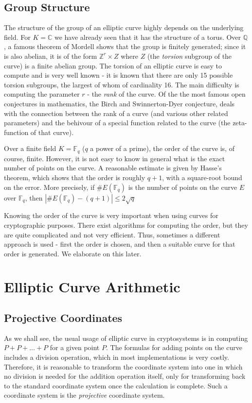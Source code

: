\documentclass[11pt,english]{article}
\begin{document}
\subsection{Group Structure}
The structure of the group of an elliptic curve highly depends on the underlying field. For $K=\mathbb{C}$ we have already seen that it has the structure of a torus.
Over $\mathbb{Q}$, a famous theorem of Mordell shows that the group is finitely generated; since it is also abelian, it is of the form $\mathbb{Z}^r\times Z$
where $Z$ (the \emph{torsion} subgroup of the curve) is a finite abelian group. The torsion of an elliptic curve is easy to compute and is very well known -
it is known that there are only 15 possible torsion subgroups, the largest of whom of cardinality 16. The main difficulty is computing the parameter
$r$ - the \emph{rank} of the curve. Of the the most famous open conjectures in mathematics, the Birch and Swinnerton-Dyer conjecture, deals
with the connection between the rank of a curve (and various other related parameters) and the behivour of a special function related to the curve (the
zeta-function of that curve).

Over a finite field $K=\mathbb{F}_q$ ($q$ a power of a prime), the order of the curve is, of course, finite. However, it is not easy to know in general
what is the exact number of points on the curve.  A reasonable estimate is given by Hasse's theorem, which shows that the order is roughly $q+1$, with
a square-root bound on the error. More precisely, if $\#E(\mathbb{F}_q)$ is the number of points on the curve $E$ over $\mathbb{F}_q$, then 
$|\#E(\mathbb{F}_q)-(q+1)|\le 2\sqrt{q}$

Knowing the order of the curve is very important when using curves for cryptographic purposes. There exist algorithms for computing the order, but
they are quite complicated and not very efficient. Thus, sometimes a different approach is used - first the order is chosen, and then a suitable curve
for that order is generated. We elaborate on this later.
\section{Elliptic Curve Arithmetic}
\subsection{Projective Coordinates}
As we shall see, the usual usage of elliptic curve in cryptosystems is in computing $P+P+\dots+P$ for a given point $P$. 
The formulas for adding points on the curve includes a division operation, which in most implementations is very costly. Therefore, it is reasonable to
transform the coordinate system into one in which no division is needed for the addition operation itself, only for transforming back to the standard
coordinate system once the calculation is complete. Such a coordinate system is the \emph{projective} coordinate system.
\end{document}
